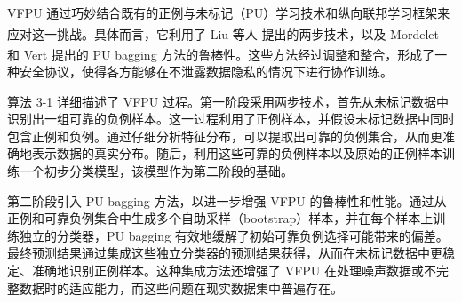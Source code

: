 VFPU 通过巧妙结合既有的正例与未标记（PU）学习技术和纵向联邦学习框架来应对这一挑战。具体而言，它利用了 Liu 等人\textsuperscript{\cite{liu2003building}} 提出的两步技术，以及 Mordelet 和 Vert \textsuperscript{\cite{mordelet2014bagging}} 提出的 PU bagging 方法的鲁棒性。这些方法经过调整和整合，形成了一种安全协议，使得各方能够在不泄露数据隐私的情况下进行协作训练。

算法 3-1 详细描述了 VFPU 过程。第一阶段采用两步技术，首先从未标记数据中识别出一组可靠的负例样本。这一过程利用了正例样本，并假设未标记数据中同时包含正例和负例。通过仔细分析特征分布，可以提取出可靠的负例集合，从而更准确地表示数据的真实分布。随后，利用这些可靠的负例样本以及原始的正例样本训练一个初步分类模型，该模型作为第二阶段的基础。


第二阶段引入 PU bagging 方法，以进一步增强 VFPU 的鲁棒性和性能。通过从正例和可靠负例集合中生成多个自助采样（bootstrap）样本，并在每个样本上训练独立的分类器，PU bagging 有效地缓解了初始可靠负例选择可能带来的偏差。最终预测结果通过集成这些独立分类器的预测结果获得，从而在未标记数据中更稳定、准确地识别正例样本。这种集成方法还增强了 VFPU 在处理噪声数据或不完整数据时的适应能力，而这些问题在现实数据集中普遍存在。

